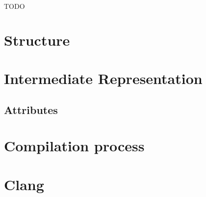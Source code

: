 TODO \cite{Lattner:MSThesis02}
\section{Structure}
\section{Intermediate Representation}
\subsection{Attributes}
\section{Compilation process}
\section{Clang}